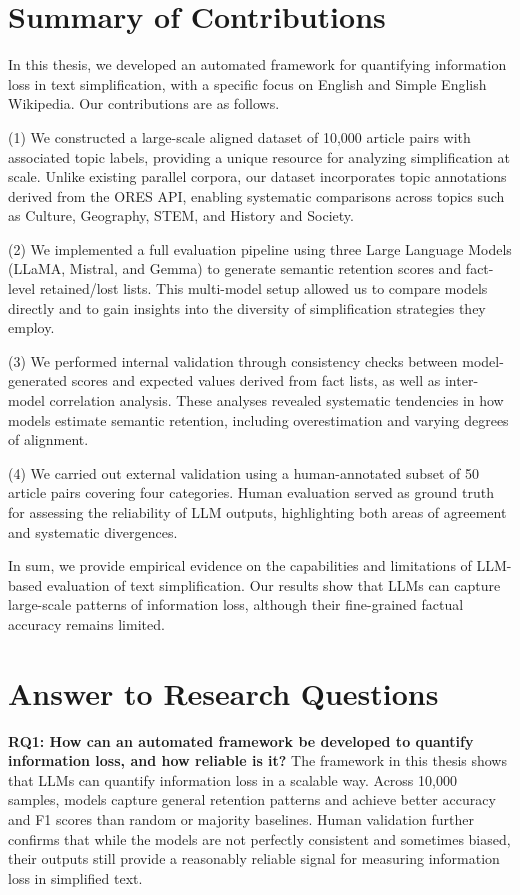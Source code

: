 \documentclass{DESSThesis}
\begin{document}
\section{Summary of Contributions}
In this thesis, we developed an automated framework for quantifying information loss in text simplification, with a specific focus on English and Simple English Wikipedia. Our contributions are as follows.

(1) We constructed a large-scale aligned dataset of 10,000 article pairs with associated topic labels, providing a unique resource for analyzing simplification at scale. Unlike existing parallel corpora, our dataset incorporates topic annotations derived from the ORES API, enabling systematic comparisons across topics such as Culture, Geography, STEM, and History and Society.

(2) We implemented a full evaluation pipeline using three Large Language Models (LLaMA, Mistral, and Gemma) to generate semantic retention scores and fact-level retained/lost lists. This multi-model setup allowed us to compare models directly and to gain insights into the diversity of simplification strategies they employ.

(3) We performed internal validation through consistency checks between model-generated scores and expected values derived from fact lists, as well as inter-model correlation analysis. These analyses revealed systematic tendencies in how models estimate semantic retention, including overestimation and varying degrees of alignment.

(4) We carried out external validation using a human-annotated subset of 50 article pairs covering four categories. Human evaluation served as ground truth for assessing the reliability of LLM outputs, highlighting both areas of agreement and systematic divergences.

In sum, we provide empirical evidence on the capabilities and limitations of LLM-based evaluation of text simplification. Our results show that LLMs can capture large-scale patterns of information loss, although their fine-grained factual accuracy remains limited.

\section{Answer to Research Questions}
\textbf{RQ1: How can an automated framework be developed to quantify information loss, and how reliable is it?}  
The framework in this thesis shows that LLMs can quantify information loss in a scalable way. Across 10{,}000 samples, models capture general retention patterns and achieve better accuracy and F1 scores than random or majority baselines. Human validation further confirms that while the models are not perfectly consistent and sometimes biased, their outputs still provide a reasonably reliable signal for measuring information loss in simplified text.
\end{document}
